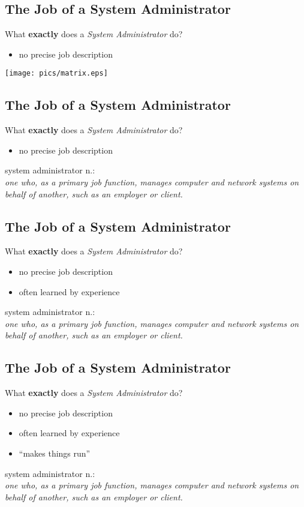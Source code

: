 \documentclass[xga]{xdvislides}
\begin{document}
\subsection{The Job of a System Administrator}
What {\bf exactly} does a {\em System Administrator} do?
\begin{itemize}
	\item no precise job description
\end{itemize}

	\begin{center}
		\texttt{[image: pics/matrix.eps]} \\
	\end{center}




\subsection{The Job of a System Administrator}
What {\bf exactly} does a {\em System Administrator} do?
\begin{itemize}
	\item no precise job description
\end{itemize}
\vfill
 system administrator n.: \\
{\em one who, as a primary job function,
	manages computer and network systems on behalf of another, such as an
	employer or client.}

\subsection{The Job of a System Administrator}
What {\bf exactly} does a {\em System Administrator} do?
\begin{itemize}
	\item no precise job description
	\item often learned by experience
\end{itemize}
\vfill
system administrator n.: \\
{\em one who, as a primary job function,
	manages computer and network systems on behalf of another, such as an
	employer or client.}

\subsection{The Job of a System Administrator}
What {\bf exactly} does a {\em System Administrator} do?
\begin{itemize}
	\item no precise job description
	\item often learned by experience
	\item ``makes things run''
\end{itemize}
\vfill
system administrator n.: \\
{\em one who, as a primary job function,
	manages computer and network systems on behalf of another, such as an
	employer or client.}
\end{document}
